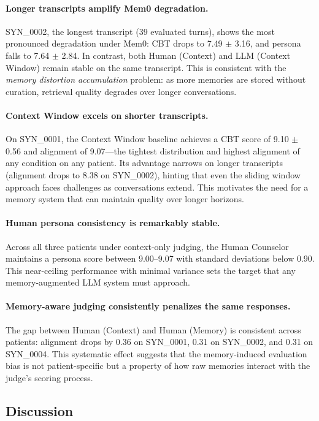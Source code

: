 \documentclass{article} %
\begin{document}
\paragraph{Longer transcripts amplify Mem0 degradation.} SYN\_0002, the longest transcript (39 evaluated turns), shows the most pronounced degradation under Mem0: CBT drops to 7.49 $\pm$ 3.16, and persona falls to 7.64 $\pm$ 2.84. In contrast, both Human (Context) and LLM (Context Window) remain stable on the same transcript. This is consistent with the \emph{memory distortion accumulation} problem: as more memories are stored without curation, retrieval quality degrades over longer conversations.

\paragraph{Context Window excels on shorter transcripts.} On SYN\_0001, the Context Window baseline achieves a CBT score of 9.10 $\pm$ 0.56 and alignment of 9.07---the tightest distribution and highest alignment of any condition on any patient. Its advantage narrows on longer transcripts (alignment drops to 8.38 on SYN\_0002), hinting that even the sliding window approach faces challenges as conversations extend. This motivates the need for a memory system that can maintain quality over longer horizons.

\paragraph{Human persona consistency is remarkably stable.} Across all three patients under context-only judging, the Human Counselor maintains a persona score between 9.00--9.07 with standard deviations below 0.90. This near-ceiling performance with minimal variance sets the target that any memory-augmented LLM system must approach.

\paragraph{Memory-aware judging consistently penalizes the same responses.} The gap between Human (Context) and Human (Memory) is consistent across patients: alignment drops by 0.36 on SYN\_0001, 0.31 on SYN\_0002, and 0.31 on SYN\_0004. This systematic effect suggests that the memory-induced evaluation bias is not patient-specific but a property of how raw memories interact with the judge's scoring process.

\subsection{Discussion}
\end{document}
